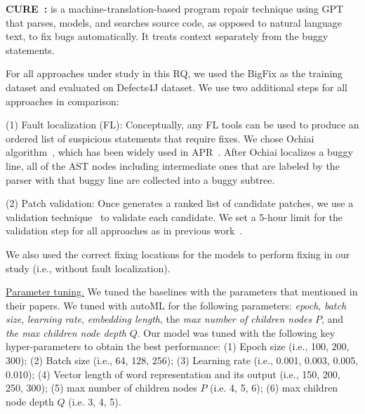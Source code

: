 {\bf CURE~\cite{cure-icse21}: } is a machine-translation-based program
repair technique using GPT~\cite{radford2018improving} that parses,
models, and searches source code, as opposed to natural language text,
to fix bugs automatically. It treats context separately from the buggy
statements.




For all approaches under study in this RQ, we used the BigFix as the
training dataset and evaluated on Defects4J dataset. 
We use two additional steps for all approaches in comparison:

(1) Fault localization (FL): Conceptually, any FL
tools can be used to produce an ordered list of suspicious
statements that require fixes. We chose Ochiai
algorithm~\cite{abreu2006evaluation, pearson2017evaluating}, which has
been widely used in
APR~\cite{jiang2018shaping,xiong2017precise,koyuncu2018fixminer,xin2017leveraging,wen2018context,liu2018lsrepair}.
After Ochiai localizes a buggy line, all of the AST nodes including
intermediate ones that are labeled by the parser with that buggy line
are collected into a buggy subtree.

(2) Patch validation: Once {\tool} generates a ranked list of
candidate patches, we use a validation
technique~\cite{saha2017elixir,jiang2018shaping} to validate each
candidate.
We set a 5-hour limit for the validation step for all approaches as in
previous work~\cite{icse20,tbar-issta19}.

We also used the correct fixing locations for the models to perform
fixing in our study (i.e., without fault localization).



\underline{Parameter tuning.} We tuned the baselines with the
parameters that mentioned in their papers. We tuned \tool with autoML
\cite{NNI} for the following parameters: {\em epoch}, {\em batch
  size}, {\em learning rate}, {\em embedding length}, the {\em max
  number of children nodes $P$}, and {\em the max children node depth}
$Q$. Our model was tuned with the following key hyper-parameters to
obtain the best performance: (1) Epoch size (i.e., 100, 200, 300); (2)
Batch size (i.e., 64, 128, 256); (3) Learning rate (i.e., 0.001,
0.003, 0.005, 0.010); (4) Vector length of word representation and its
output (i.e., 150, 200, 250, 300); (5) max number of children nodes
$P$ (i.e. 4, 5, 6); (6) max children node depth $Q$ (i.e. 3, 4, 5).

